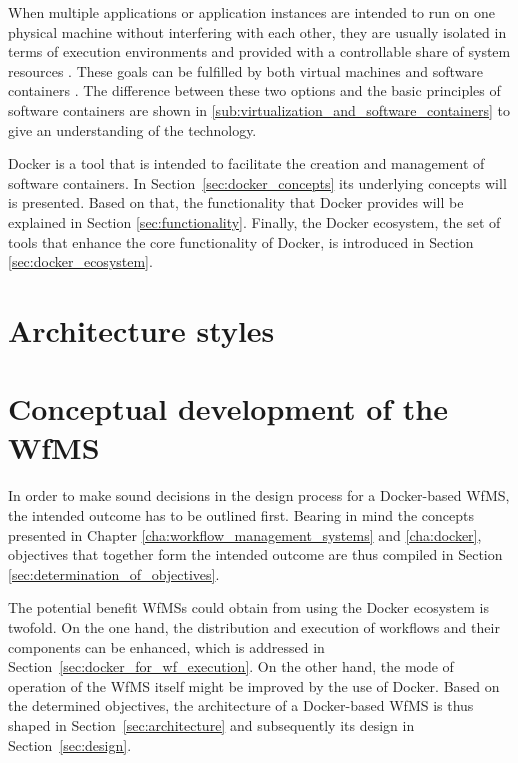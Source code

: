 \documentclass[language=english,noinputenc]{wiwwuwordrprt}
\begin{document}
    When multiple applications or application instances are intended to run on one physical machine without interfering with each other, they are usually isolated in terms of execution environments and provided with a controllable share of system resources \cite{Felter2014Updated}. These goals can be fulfilled by both virtual machines and software containers \cite{Ruiz2015Performance}. The difference between these two options and the basic principles of software containers are shown in \ref{sub:virtualization_and_software_containers} to give an understanding of the technology.

    Docker is a tool that is intended to facilitate the creation and management of software containers. In Section~\ref{sec:docker_concepts} its underlying concepts will is presented. Based on that, the functionality that Docker provides will be explained in Section \ref{sec:functionality}. Finally, the Docker ecosystem, \ie the set of tools that enhance the core functionality of Docker, is introduced in Section \ref{sec:docker_ecosystem}.

    

  \chapter{Architecture styles} %
  \label{cha:architecture_styles}
    


  \chapter{Conceptual development of the \ac{WfMS}} %
    \label{cha:solution_design}

    In order to make sound decisions in the design process for a Docker-based \ac{WfMS}, the intended outcome has to be outlined first. Bearing in mind the concepts presented in Chapter \ref{cha:workflow_management_systems} and \ref{cha:docker}, objectives that together form the intended outcome are thus compiled in Section \ref{sec:determination_of_objectives}.

    The potential benefit \acp{WfMS} could obtain from using the Docker ecosystem is twofold.
    On the one hand, the distribution and execution of workflows and their components can be enhanced, which is addressed in Section~\ref{sec:docker_for_wf_execution}.
    On the other hand, the mode of operation of the \ac{WfMS} itself might be improved by the use of Docker.
    Based on the determined objectives, the architecture of a Docker-based \ac{WfMS} is thus shaped in Section~\ref{sec:architecture} and subsequently its design in Section~\ref{sec:design}.
\end{document}
